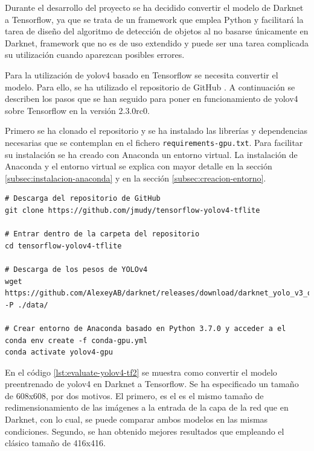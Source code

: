 Durante el desarrollo del proyecto se ha decidido convertir el modelo de Darknet a Tensorflow, ya que se trata de un framework que emplea Python y facilitará la tarea de diseño del algoritmo de detección de objetos al no basarse únicamente en Darknet, framework que no es de uso extendido y puede ser una tarea complicada su utilización cuando aparezcan posibles errores.

Para la utilización de \gls{yolov4} basado en Tensorflow se necesita convertir el modelo. Para ello, se ha utilizado el repositorio de GitHub \cite{yolov4-tf-github}. A continuación se describen los pasos que se han seguido para poner en funcionamiento de \gls{yolov4} sobre Tensorflow en la versión 2.3.0rc0.

Primero se ha clonado el repositorio y se ha instalado las librerías y dependencias necesarias que se contemplan en el fichero \texttt{requirements-gpu.txt}. Para facilitar su instalación se ha creado con Anaconda un entorno virtual. La instalación de Anaconda y el entorno virtual se explica con mayor detalle en la sección \ref{subsec:instalacion-anaconda} y en la sección \ref{subsec:creacion-entorno}.

\vspace{0.5cm}
\begin{lstlisting}[language=iPython,caption=Evaluación del detector de objetos YOLOv4 en Tensorflow (1),captionpos=b,label={lst:evaluate-yolov4-tf1}]
# Descarga del repositorio de GitHub
git clone https://github.com/jmudy/tensorflow-yolov4-tflite

# Entrar dentro de la carpeta del repositorio
cd tensorflow-yolov4-tflite

# Descarga de los pesos de YOLOv4
wget https://github.com/AlexeyAB/darknet/releases/download/darknet_yolo_v3_optimal/yolov4.weights -P ./data/

# Crear entorno de Anaconda basado en Python 3.7.0 y acceder a el
conda env create -f conda-gpu.yml
conda activate yolov4-gpu
\end{lstlisting}

En el código \ref{lst:evaluate-yolov4-tf2} se muestra como convertir el modelo preentrenado de \gls{yolov4} en Darknet a Tensorflow. Se ha especificado un tamaño de 608x608, por dos motivos. El primero, es el es el mismo tamaño de redimensionamiento de las imágenes a la entrada de la capa de la red que en Darknet, con lo cual, se puede comparar ambos modelos en las mismas condiciones. Segundo, se han obtenido mejores resultados que empleando el clásico tamaño de 416x416.

